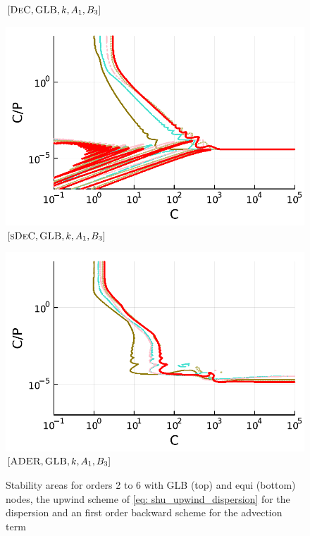 \begin{figure}
\begin{minipage}[t]{0.32\textwidth}
		\small$[\textsc{DeC}, \textsc{GLB},k, A_1,B_3]$\par
	\end{minipage}
	\begin{minipage}[t]{0.32\textwidth}
		\centering
		\includegraphics[width=\textwidth]{pdf/pdepics/disp/IMEXDeC_subtimesteps_gaussLobatto_disp_TMM_2-6_newE.pdf}
		\small$[\textsc{sDeC}, \textsc{GLB},k, A_1,B_3]$\par
	\end{minipage}
	\begin{minipage}[t]{0.32\textwidth}
		\centering
		\includegraphics[width=\textwidth]{pdf/pdepics/disp/IMEXADER_gaussLobatto_disp_TMM_2-6_newE.pdf}
		\small$[\textsc{ADER}, \textsc{GLB},k, A_1,B_3]$\par
	\end{minipage}
	\caption{Stability areas for orders 2 to 6 with GLB (top) and equi (bottom) nodes, the upwind scheme of \eqref{eq: shu_upwind_dispersion} for the dispersion and an first order backward scheme for the advection term}
	\label{fig: disp_allRK}
\end{figure}

